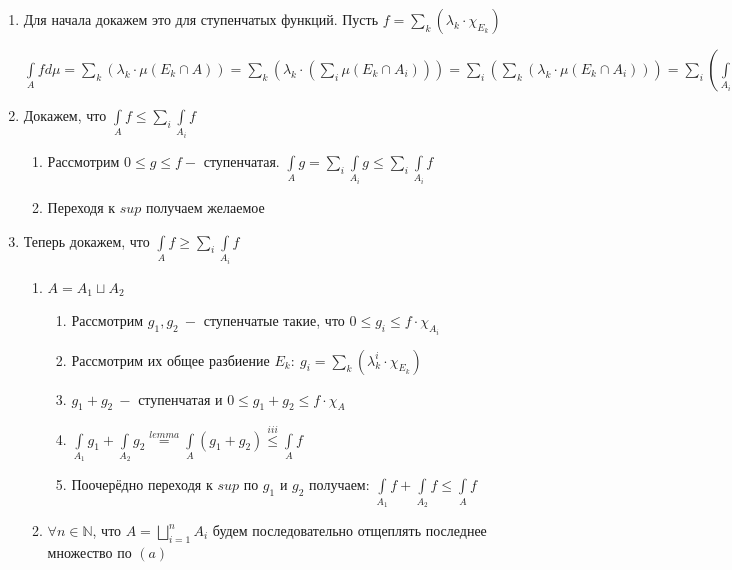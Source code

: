 \documentclass[paper=a4, fontsize=17pt]{article}
\begin{document}
\begin{enumerate}
	\item Для начала докажем это для ступенчатых функций. Пусть $f = \sum\limits_{k} (\lambda_k \cdot \chi_{E_k})$

 $\int\limits_{A}fd\mu = \sum\limits_{k} (\lambda_k \cdot \mu(E_k \cap A)) =
 \sum\limits_{k} (\lambda_k \cdot (\sum\limits_{i} \mu(E_k \cap A_i))) =
 \sum\limits_{i}(\sum\limits_{k}(\lambda_k \cdot \mu(E_k \cap A_i))) = \sum\limits_{i}(\int\limits_{A_i}f)$

	\item Докажем, что $\int\limits_{A}f \leqslant \sum\limits_{i} \int\limits_{A_{i}}f$

	\begin{enumerate}
		\item Рассмотрим $0 \leqslant g \leqslant f - $ ступенчатая. $\int\limits_{A}g = \sum\limits_{i} \int\limits_{A_i}g \leqslant \sum\limits_{i} \int\limits_{A_{i}}f$

		 \item Переходя к $sup$ получаем желаемое
	\end{enumerate}

	\item Теперь докажем, что $\int\limits_{A}f \geqslant \sum\limits_{i} \int\limits_{A_{i}}f$
	\begin{enumerate}
		\item $A = A_1\sqcup A_2$

		\begin{enumerate}
			\item Рассмотрим $g_1, g_2\ -$ ступенчатые такие, что $0 \leqslant g_i \leqslant f \cdot \chi_{A_i}$

			\item Рассмотрим их общее разбиение $E_k:\ g_i = \sum\limits_k (\lambda_k^i \cdot \chi_{E_k})$

			\item $g_1 + g_2\ - $ ступенчатая и $0 \leqslant g_1 + g_2 \leqslant f \cdot \chi_{A}$

			\item $\int\limits_{A_1}g_1 + \int\limits_{A_2}g_2 \stackrel{lemma}{=} \int\limits_{A}(g_1 + g_2) \stackrel{iii}{\leqslant} \int\limits_{A}f$

			\item Поочерёдно переходя к $sup$ по $g_1$ и $g_2$ получаем: $\int\limits_{A_1}f + \int\limits_{A_2}f \leqslant \int\limits_{A}f$
		\end{enumerate}

	\item $\forall n \in \mathbb{N}$, что $A = \bigsqcup\limits_{i=1}^{n}A_{i}$ будем последовательно отщеплять последнее множество по $(a)$


\end{enumerate}
\end{enumerate}
\end{document}
